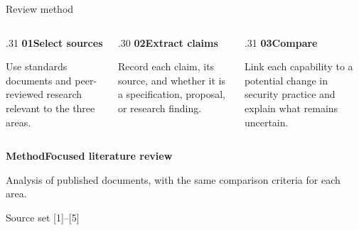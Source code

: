 \documentclass[aspectratio=169,11pt]{beamer}
\newcommand{\status}[1]{{\small\bfseries\color{Blue}#1}}
\newcommand{\source}[1]{\par\vfill{\footnotesize\color{Muted}#1}\par\vspace{.18cm}}
\begin{document}
\begin{frame}[t]{Review method}
\vspace{.37cm}
\begin{columns}[T,onlytextwidth]
  \begin{column}{.31\textwidth}
  \status{01\quad Select sources}\par\vspace{.18cm}
  Use standards documents and peer-reviewed research relevant to the three areas.
  \end{column}
  \begin{column}{.30\textwidth}
  \status{02\quad Extract claims}\par\vspace{.18cm}
  Record each claim, its source, and whether it is a specification, proposal, or research finding.
  \end{column}
  \begin{column}{.31\textwidth}
  \status{03\quad Compare}\par\vspace{.18cm}
  Link each capability to a potential change in security practice and explain what remains uncertain.
  \end{column}
\end{columns}
\vspace{.72cm}

{\large\bfseries Method\quad Focused literature review\par}
\vspace{.15cm}
{\color{Muted}Analysis of published documents, with the same comparison criteria for each area.\par}
\source{Source set [1]--[5]}
\end{frame}
\end{document}
